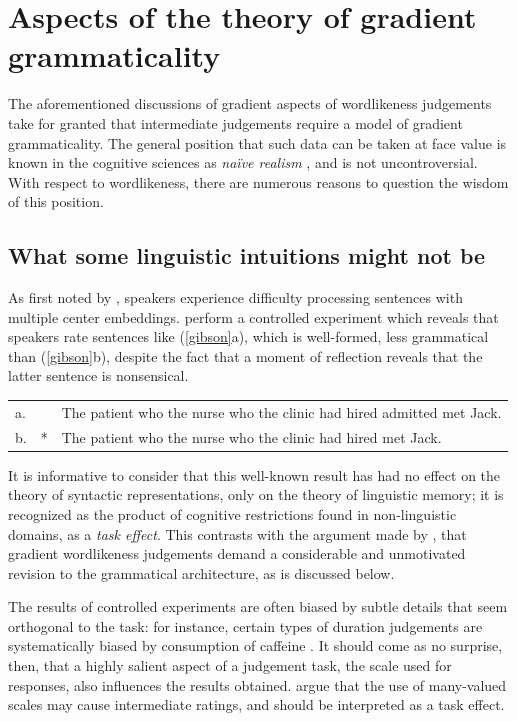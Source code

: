 \section{Aspects of the theory of gradient grammaticality}

The aforementioned discussions of gradient aspects of wordlikeness judgements take for granted that intermediate judgements require a model of gradient grammaticality. 
The general position that such data can be taken at face value is known in the cognitive sciences as \emph{naïve realism} \citep{Fodor1981a}, and is not uncontroversial. 
With respect to wordlikeness, there are numerous reasons to question the wisdom of this position.

\subsection{What some linguistic intuitions might not be}

As first noted by \citet{Chomsky1963b}, speakers experience difficulty processing sentences with multiple center embeddings. 
\citet{Gibson1999} perform a controlled experiment which reveals that speakers rate sentences like (\ref{gibson}a), which is well-formed, less grammatical than (\ref{gibson}b), despite the fact that a moment of reflection reveals that the latter sentence is nonsensical.

\begin{example}
\label{gibson}
\begin{tabular}{l l@{}l}
a. &    & The patient who the nurse who the clinic had hired admitted met Jack. \\
b. & *  & The patient who the nurse who the clinic had hired met Jack. \\
\end{tabular}
\end{example}

\noindent
It is informative to consider that this well-known result has had no effect on the theory of syntactic representations, only on the theory of linguistic memory; it is recognized as the product of cognitive restrictions found in non-linguistic domains, as a \emph{task effect}.
This contrasts with the argument made by \citet{Hayes2000}, that gradient wordlikeness judgements demand a considerable and unmotivated revision to the grammatical architecture, as is discussed below.

The results of controlled experiments are often biased by subtle details that seem orthogonal to the task: for instance, certain types of duration judgements are systematically biased by consumption of caffeine \citep{Gruber2005}. 
It should come as no surprise, then, that a highly salient aspect of a judgement task, the scale used for responses, also influences the results obtained.
\citet*{Armstrong1983} argue that the use of many-valued scales may cause intermediate ratings, and should be interpreted as a task effect.

